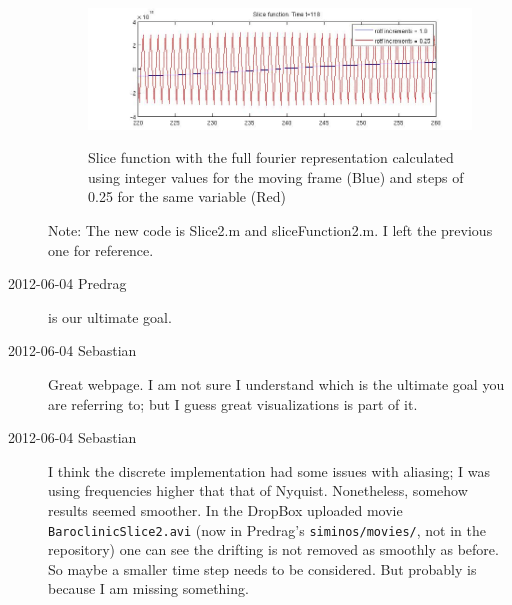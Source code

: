 \begin{description}
\begin{figure}
  \includegraphics[width=1\textwidth]{SliceCondition2}\\
  \caption{Slice function with the full fourier representation  calculated using integer values for the moving frame (Blue) and steps of 0.25 for the same variable (Red)}\label{SliceCondition2}
\end{figure}
Note: The new code is Slice2.m and sliceFunction2.m. I left the previous one for reference.


\item[2012-06-04 Predrag]
 is our ultimate goal.

\item[2012-06-04 Sebastian]
Great webpage. I am not sure I understand which is the ultimate goal you
are referring to; but I guess great visualizations is part of it.

\item[2012-06-04 Sebastian]
I think the discrete implementation had some issues with aliasing; I was
using frequencies higher that that of Nyquist. Nonetheless, somehow
results seemed smoother. In the DropBox uploaded movie
\texttt{BaroclinicSlice2.avi} (now in Predrag's \texttt{siminos/movies/},
not in the repository) one can see the drifting is not removed as
smoothly as before. So maybe a smaller time step needs to be considered.
But probably is because I am missing something.



\end{description}
